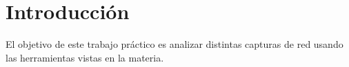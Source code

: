 \section{Introducción}

El objetivo de este trabajo práctico es analizar distintas capturas de red usando las herramientas vistas en la materia.

